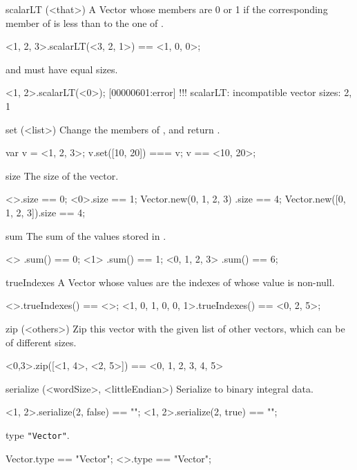 \begin{urbiscriptapi}
\item[scalarLT](<that>)%
  A Vector whose members are 0 or 1 if the corresponding member of \this is
  less than to the one of \that.
\begin{urbiassert}
  <1, 2, 3>.scalarLT(<3, 2, 1>) == <1, 0, 0>;
\end{urbiassert}

  \this and \that must have equal sizes.
\begin{urbiscript}
<1, 2>.scalarLT(<0>);
[00000601:error] !!! scalarLT: incompatible vector sizes: 2, 1
\end{urbiscript}


\item[set](<list>)%
  Change the members of \this, and return \this.
\begin{urbiassert}
var v = <1, 2, 3>;
v.set([10, 20]) === v;
v == <10, 20>;
\end{urbiassert}


\item[size]%
  The size of the vector.
\begin{urbiassert}
                      <>.size == 0;
                     <0>.size == 1;
Vector.new(0, 1, 2, 3)  .size == 4;
Vector.new([0, 1, 2, 3]).size == 4;
\end{urbiassert}


\item[sum]%
  The sum of the values stored in \this.
\begin{urbiassert}
<>            .sum() == 0;
<1>           .sum() == 1;
<0, 1, 2, 3>  .sum() == 6;
\end{urbiassert}


\item[trueIndexes]%
  A Vector whose values are the indexes of \this whose value is non-null.
\begin{urbiassert}
<>.trueIndexes() == <>;
<1, 0, 1, 0, 0, 1>.trueIndexes() == <0, 2, 5>;
\end{urbiassert}

\item[zip](<others>)%
  Zip this vector with the given list of other vectors, which can be of different sizes.

\begin{urbiassert}
 <0,3>.zip([<1, 4>, <2, 5>]) == <0, 1, 2, 3, 4, 5>
\end{urbiassert}

\item[serialize](<wordSize>, <littleEndian>)%
  Serialize to binary integral data.

\begin{urbiassert}
  <1, 2>.serialize(2, false) == "";
  <1, 2>.serialize(2, true)  == "";
\end{urbiassert}

\item[type]%
  \lstinline|"Vector"|.
\begin{urbiassert}
Vector.type == "Vector";
<>.type == "Vector";
\end{urbiassert}
\end{urbiscriptapi}

